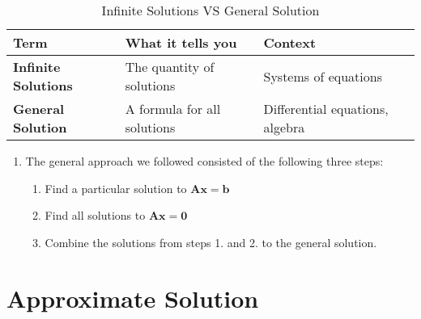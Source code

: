 \begin{customArrayStretch}{1.3}
\begin{table}[H]
    \centering
    \begin{tabular}{|l|l|l|}
        \hline
        \textbf{Term} & 
            \textbf{What it tells you} & 
            \textbf{Context} \\ \hline

        \textbf{Infinite Solutions} & 
            The quantity of solutions & 
            Systems of equations \\ \hline

        \textbf{General Solution} & 
            A formula for all solutions & 
            Differential equations, algebra \\ \hline

    \end{tabular}
    \caption*{Infinite Solutions VS General Solution \cite{common/online/chatgpt}}
\end{table}
\end{customArrayStretch}


\begin{enumerate}
    \item The general approach we followed consisted of the following three steps:
    \begin{enumerate}
        \item Find a particular solution to $\bm{Ax} = \bm{b}$
        \hfill \cite{mfml/book/mml/Deisenroth-Faisal-Ong}

        \item Find all solutions to $\bm{Ax} = \bm{0}$
        \hfill \cite{mfml/book/mml/Deisenroth-Faisal-Ong}

        \item Combine the solutions from steps 1. and 2. to the general solution.
        \hfill \cite{mfml/book/mml/Deisenroth-Faisal-Ong}
    \end{enumerate}

    
\end{enumerate}









\section{Approximate Solution}

